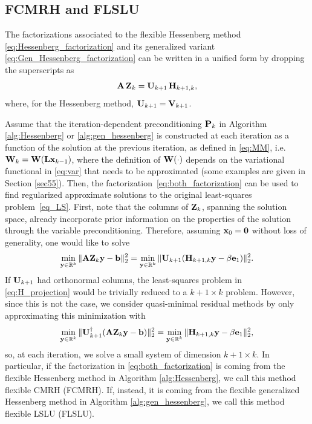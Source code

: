 \documentclass[11pt]{article}
\numberwithin{equation}{section}
\newcommand{\bfA}{{\bf A}}
\newcommand{\bfH}{{\bf H}}
\newcommand{\bfL}{{\bf L}}
\newcommand{\bfP}{{\bf P}}
\newcommand{\bfU}{{\bf U}}
\newcommand{\bfV}{{\bf V}}
\newcommand{\bfW}{{\bf W}}
\newcommand{\bfZ}{{\bf Z}}
\newcommand{\bfb}{{\bf b}}
\newcommand{\bfe}{{\bf e}}
\newcommand{\bfx}{{\bf x}}
\newcommand{\bfy}{{\bf y}}
\begin{document}
\subsection{FCMRH and FLSLU}
The factorizations associated to the flexible Hessenberg method \eqref{eq:Hessenberg_factorization} and its generalized variant \eqref{eq:Gen_Hessenberg_factorization} can be written in a unified form by dropping the superscripts as
\begin{equation}\label{eq:both_factorization}
    \bfA \, \bfZ_{k} = \bfU_{k+1}  \, \bfH_{k+1,k},
\end{equation}
where, for the Hessenberg method, $\bfU_{k+1}=\bfV_{k+1}$.   

Assume that the iteration-dependent preconditioning $\bfP_k$ in Algorithm \ref{alg:Hessenberg} or \ref{alg:gen_hessenberg} is constructed at each iteration as a function of the solution at the previous iteration, as defined in \eqref{eq:MM}, i.e. $\bfW_k =\bfW(\bfL \bfx_{k-1})$, where the definition of $\bfW(\cdot)$ depends on the variational functional in \eqref{eq:var} that needs to be approximated (some examples are given in Section \ref{sec55}). Then, the factorization~\eqref{eq:both_factorization} can be used to find regularized  approximate solutions to the original least-squares problem~\eqref{eq_LS}. First, note that the columns of $\bfZ_{k}$, spanning the solution space, already incorporate prior information on the properties of the solution through the variable preconditioning. Therefore, assuming $\bfx_0=\bf0$ without loss of generality, one would like to solve 
\begin{equation}\label{eq:H_projection}
   \min_{\bfy\in\mathbb{R}^k} \| \bfA \bfZ_k\bfy -\bfb \|_2^2 = \min_{\bfy\in\mathbb{R}^k} \| \bfU_{k+1} (\bfH_{k+1,k}\bfy -\beta \bfe_1) \|_2^2.
\end{equation}
If $\bfU_{k+1}$ had orthonormal columns, the least-squares problem in \eqref{eq:H_projection} would be trivially reduced to a $k+1 \times k$ problem. However, since this is not the case, we consider quasi-minimal residual methods by only approximating this minimization with 
\begin{equation}\label{eq:H_projection_approx}
   \min_{\bfy\in\mathbb{R}^k} \| \bfU^{\dagger}_{k+1}(\bfA \bfZ_k\bfy -\bfb) \|_2^2 = \min_{\bfy\in\mathbb{R}^k} \| \bfH_{k+1,k}\bfy -\beta \bfe_1 \|_2^2,
\end{equation}
so, at each iteration, we solve a small system of dimension $k+1 \times k$. In particular, if the factorization in \eqref{eq:both_factorization} is coming from the flexible Hessenberg method in Algorithm
\ref{alg:Hessenberg}, we call this method flexible CMRH (FCMRH). If, instead, it is coming from the flexible generalized Hessenberg method in Algorithm
\ref{alg:gen_hessenberg}, we call this method flexible LSLU (FLSLU).
\end{document}
